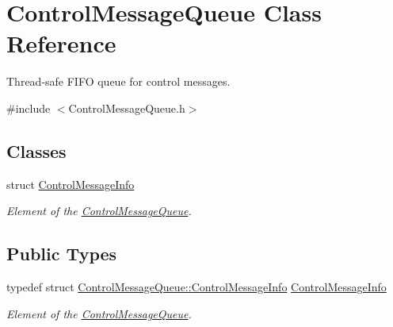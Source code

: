 \hypertarget{classControlMessageQueue}{}\section{Control\+Message\+Queue Class Reference}
\label{classControlMessageQueue}


Thread-\/safe F\+I\+FO queue for control messages.  




{\ttfamily \#include $<$Control\+Message\+Queue.\+h$>$}

\subsection*{Classes}
\begin{DoxyCompactItemize}
\item 
struct \mbox{\hyperlink{structControlMessageQueue_1_1ControlMessageInfo}{Control\+Message\+Info}}
\begin{DoxyCompactList}\small\item\em Element of the \mbox{\hyperlink{classControlMessageQueue}{Control\+Message\+Queue}}. \end{DoxyCompactList}\end{DoxyCompactItemize}
\subsection*{Public Types}
\begin{DoxyCompactItemize}
\item 
typedef struct \mbox{\hyperlink{structControlMessageQueue_1_1ControlMessageInfo}{Control\+Message\+Queue\+::\+Control\+Message\+Info}} \mbox{\hyperlink{classControlMessageQueue_a50df92d449dae01e49fd0e836c7d1f2e}{Control\+Message\+Info}}
\begin{DoxyCompactList}\small\item\em Element of the \mbox{\hyperlink{classControlMessageQueue}{Control\+Message\+Queue}}. \end{DoxyCompactList}\end{DoxyCompactItemize}
